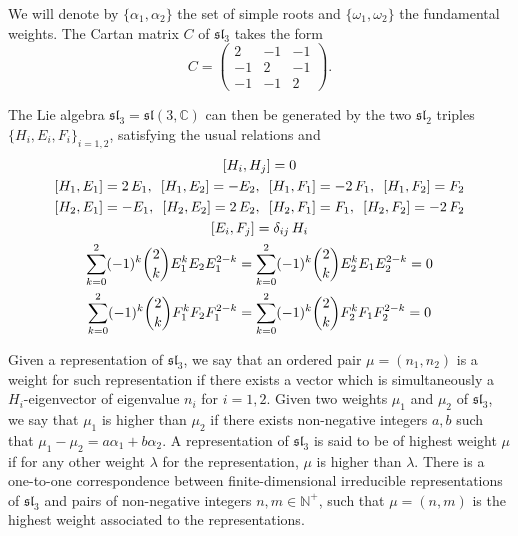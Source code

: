 \documentclass[12pt,oneside,reqno]{amsart}
\def\N{\mathbb{N}}
\def\C{\mathbb{C}}
\numberwithin{teorema}{section}
\numberwithin{definicion}{section}
\numberwithin{lema}{section}
\numberwithin{conjetura}{section}
\numberwithin{proposicion}{section}
\def\sl{\mathfrak{sl}}
\begin{document}
We will denote by $\{\alpha_1,\alpha_2\}$ the set of simple roots and $\{\omega_1,\omega_2\}$ the fundamental weights. The Cartan matrix $C$ of $\sl_3$ takes the form
\begin{equation*}
    C = \begin{pmatrix}
    2 & -1 & -1\\
    -1 & 2 & -1\\
    -1 & -1 & 2
    \end{pmatrix}.
\end{equation*}

The Lie algebra $\sl_3=\sl(3,\C)$ can then be generated by the two $\sl_2$ triples $\{H_i,E_i,F_i\}_{i=1,2}$, satisfying the usual relations and
\begin{gather}
    \label{eq:sl3-H-relation} [H_i,H_j]=0 \\
    \label{eq:sl3-HE-relation1} [H_1,E_1]=2\,E_1, \hspace{0.5em} [H_1,E_2]=-E_2, \hspace{0.5em}
    [H_1,F_1]=-2\,F_1, \hspace{0.5em} [H_1,F_2]=F_2 \\
    \label{eq:sl3-HF-relation2} [H_2,E_1]=-E_1, \hspace{0.5em} [H_2,E_2]=2\,E_2, \hspace{0.5em}
    [H_2,F_1]=F_1, \hspace{0.5em} [H_2,F_2]=-2\,F_2 \\
    [E_i,F_j]=\delta_{ij}\,H_i \\ \label{eq:sl3-E-relation}
    \sum_{k=0}^2 (-1)^k \binom{2}{k} E_1^kE_2E_1^{2-k}=\sum_{k=0}^2 (-1)^k \binom{2}{k} E_2^kE_1E_2^{2-k}=0 \\
    \label{eq:sl3-F-relation} \sum_{k=0}^2 (-1)^k \binom{2}{k} F_1^kF_2F_1^{2-k}=\sum_{k=0}^2 (-1)^k \binom{2}{k} F_2^kF_1F_2^{2-k}=0 
\end{gather}

Given a representation of $\sl_3$, we say that an ordered pair $\mu=(n_1,n_2)$ is a weight for such representation if there exists a vector which is simultaneously a $H_i$-eigenvector of eigenvalue $n_i$ for $i=1,2$. Given two weights $\mu_1$ and $\mu_2$ of $\sl_3$, we say that $\mu_1$ is higher than $\mu_2$ if there exists non-negative integers $a,b$ such that $\mu_1-\mu_2=a\alpha_1+b\alpha_2$. A representation of $\sl_3$ is said to be of highest weight $\mu$ if for any other weight $\lambda$ for the representation, $\mu$ is higher than $\lambda$. There is a one-to-one correspondence between finite-dimensional irreducible representations of $\sl_3$ and pairs of non-negative integers $n,m\in\N^+$, such that $\mu=(n,m)$ is the highest weight associated to the representations.
\end{document}
